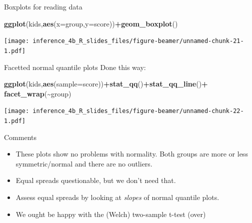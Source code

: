 \documentclass[
  ignorenonframetext,
]{beamer}
\newenvironment{Shaded}{\begin{snugshade}}{\end{snugshade}}
\newcommand{\DataTypeTok}[1]{\textcolor[rgb]{0.13,0.29,0.53}{#1}}
\newcommand{\KeywordTok}[1]{\textcolor[rgb]{0.13,0.29,0.53}{\textbf{#1}}}
\newcommand{\NormalTok}[1]{#1}
\newcommand{\OperatorTok}[1]{\textcolor[rgb]{0.81,0.36,0.00}{\textbf{#1}}}
\providecommand{\tightlist}{%
  \setlength{\itemsep}{0pt}\setlength{\parskip}{0pt}}
\begin{document}
\begin{frame}[fragile]{Boxplots for reading data}
\protect\hypertarget{boxplots-for-reading-data}{}
\begin{Shaded}
\begin{Highlighting}[]
\KeywordTok{ggplot}\NormalTok{(kids,}\KeywordTok{aes}\NormalTok{(}\DataTypeTok{x=}\NormalTok{group,}\DataTypeTok{y=}\NormalTok{score))}\OperatorTok{+}\KeywordTok{geom\_boxplot}\NormalTok{()}
\end{Highlighting}
\end{Shaded}

\texttt{[image: inference\_4b\_R\_slides\_files/figure-beamer/unnamed-chunk-21-1.pdf]}
\end{frame}

\begin{frame}[fragile]{Facetted normal quantile plots}
\protect\hypertarget{facetted-normal-quantile-plots}{}
Done this way:

\begin{Shaded}
\begin{Highlighting}[]
\KeywordTok{ggplot}\NormalTok{(kids,}\KeywordTok{aes}\NormalTok{(}\DataTypeTok{sample=}\NormalTok{score))}\OperatorTok{+}\KeywordTok{stat\_qq}\NormalTok{()}\OperatorTok{+}\KeywordTok{stat\_qq\_line}\NormalTok{()}\OperatorTok{+}
\KeywordTok{facet\_wrap}\NormalTok{(}\OperatorTok{\textasciitilde{}}\NormalTok{group)}
\end{Highlighting}
\end{Shaded}

\texttt{[image: inference\_4b\_R\_slides\_files/figure-beamer/unnamed-chunk-22-1.pdf]}
\end{frame}

\begin{frame}{Comments}
\protect\hypertarget{comments-2}{}
\begin{itemize}
\tightlist
\item
  These plots show no problems with normality. Both groups are more or
  less symmetric/normal and there are no outliers.
\item
  Equal spreads questionable, but we don't need that.
\item
  Assess equal spreads by looking at \emph{slopes} of normal quantile
  plots.
\item
  We ought be happy with the (Welch) two-sample t-test (over)
\end{itemize}
\end{frame}
\end{document}
